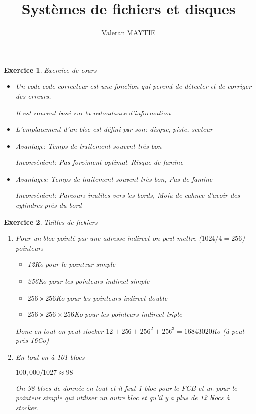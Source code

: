 \documentclass{article}
\title{\textbf{Systèmes de fichiers et disques}}
\date{}
\author{Valeran MAYTIE}
\theoremstyle{plain}
\newtheorem{exo}{Exercice}%
\begin{document}
\maketitle

\begin{exo} Exercice de cours
\begin{itemize}
  \item Un code code correcteur est une fonction qui peremt 
    de détecter et de corriger des erreurs.

    Il est souvent basé sur la redondance d'information

  \item L'emplacement d'un bloc est défini par son: disque, piste, secteur

  \item Avantage: Temps de traitement souvent très bon

    Inconvénient: Pas forcément optimal, Risque de famine

  \item Avantages: Temps de traitement souvent très bon, Pas de famine
    
    Inconvénient: Parcours inutiles vers les bords, Moin de cahnce d'avoir des
    cylindres près du bord

\end{itemize}
\end{exo}

\begin{exo}Tailles de fichiers
\begin{enumerate}
  \item Pour un bloc pointé par une adresse indirect on peut mettre 
    ($1024 / 4 = 256$) pointeurs
  \begin{itemize}
    \item 12Ko pour le pointeur simple

    \item 256Ko pour les pointeurs indirect simple

    \item $256 \times 256$Ko pour les pointeurs indirect double

    \item $256 \times 256 \times 256$Ko pour les pointeurs indirect triple
  \end{itemize}

    Donc en tout on peut stocker $12 + 256 + 256^2 + 256^3 = 16843020$Ko 
    (à peut près 16Go)

  \item En tout on à 101 blocs

    $100,000/1027 \approx 98$

    On 98 blocs de donnée en tout et il faut 1 bloc pour le FCB
    et un pour le pointeur simple qui utiliser un autre bloc et 
    qu'il y a plus de 12 blocs à stocker.
\end{enumerate}
\end{exo}
\end{document}
